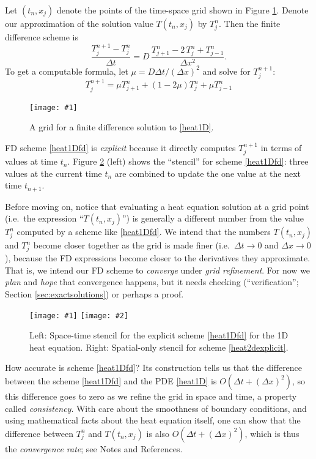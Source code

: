 \documentclass[letterpaper,final,12pt,reqno]{amsart}
\newcommand{\onefigsize}[3]{
\begin{figure}[ht]
\centering
\texttt{[image: \#1]}
\caption{#2}
\label{fig:#1}
\end{figure}}
\newcommand{\twofigsizes}[5]{
\begin{figure}[ht]
\centering
\texttt{[image: \#1]} \quad
\texttt{[image: \#2]}
\caption{#3}
\label{fig:#1}
\end{figure}}
\begin{document}
Let $(t_n,x_j)$ denote the points of the time-space grid shown in Figure \ref{fig:timespacegrid}.  Denote our approximation of the solution value $T(t_n,x_j)$ by $T_j^n$.  Then the finite difference scheme is
	$$\frac{T_j^{n+1} - T_j^n}{\Delta t} = D\,\frac{T_{j+1}^n - 2\, T_j^n + T_{j-1}^n}{\Delta x^2}.$$
To get a computable formula, let $\mu = D \Delta t / (\Delta x)^2$ and solve for $T_j^{n+1}$:
\begin{equation}
  T_j^{n+1} = \mu T_{j+1}^n + (1 - 2 \mu) T_j^n + \mu T_{j-1}^n \label{heat1Dfd}
\end{equation}

\onefigsize{timespacegrid}{A grid for a finite difference solution to \eqref{heat1D}.}{2.0in}

FD scheme \eqref{heat1Dfd} is \emph{explicit} because it directly computes $T_j^{n+1}$ in terms of values at time $t_n$.  Figure \ref{fig:expstencil} (left) shows the ``stencil'' for scheme \eqref{heat1Dfd}: three values at the current time $t_n$ are combined to update the one value at the next time $t_{n+1}$.

Before moving on, notice that evaluating a heat equation solution at a grid point (i.e.~the expression ``$T(t_n,x_j)$'') is generally a different number from the value $T_j^n$ computed by a scheme like \eqref{heat1Dfd}.  We intend that the numbers $T(t_n,x_j)$ and $T_j^n$ become closer together as the grid is made finer (i.e.~$\Delta t \to 0$ and $\Delta x \to 0$), because the FD expressions become closer to the derivatives they approximate.  That is, we intend our FD scheme to \emph{converge} under \emph{grid refinement}.  For now we \emph{plan} and \emph{hope} that convergence happens, but it needs checking (``verification''; Section \ref{sec:exactsolutions}) or perhaps a proof.

\twofigsizes{expstencil}{exp2dstencil}{Left: Space-time stencil for the explicit scheme \eqref{heat1Dfd} for the 1D heat equation.  Right: Spatial-only stencil for scheme \eqref{heat2dexplicit}.}{2.0in}{2.1in}

How accurate is scheme \eqref{heat1Dfd}?  Its construction tells us that the difference between the scheme \eqref{heat1Dfd} and the PDE \eqref{heat1D} is $O(\Delta t + (\Delta x)^2)$, so this difference goes to zero as we refine the grid in space and time, a property called \emph{consistency}.  With care about the smoothness of boundary conditions, and using mathematical facts about the heat equation itself, one can show that the difference between $T_j^n$ and $T(t_n,x_j)$ is also $O(\Delta t + (\Delta x)^2)$, which is thus the \emph{convergence rate}; see Notes and References.
\end{document}
